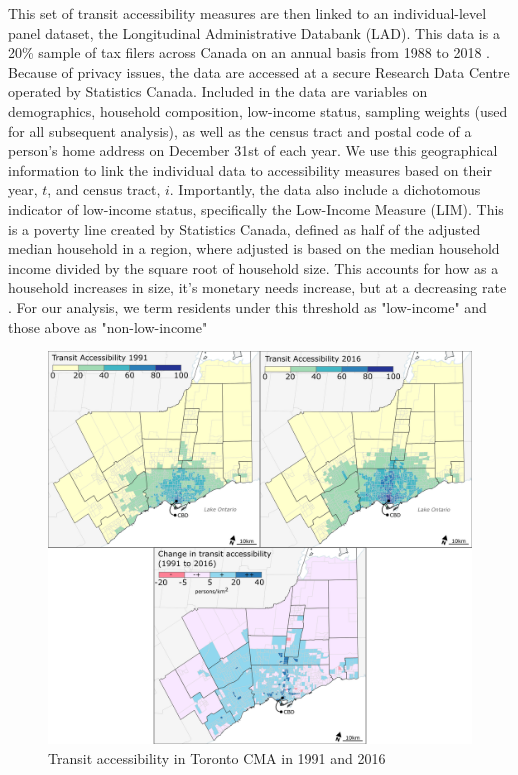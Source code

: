 This set of transit accessibility measures are then linked to an individual-level panel dataset, the Longitudinal Administrative Databank (LAD). This data is a 20\% sample of tax filers across Canada on an annual basis from 1988 to 2018 \cite{government_of_canada_longitudinal_2020}. Because of privacy issues, the data are accessed at a secure Research Data Centre operated by Statistics Canada. Included in the data are variables on demographics, household composition, low-income status, sampling weights (used for all subsequent analysis), as well as the census tract and postal code of a person's home address on December 31st of each year. We use this geographical information to link the individual data to accessibility measures based on their year, $t$, and census tract, $i$. Importantly, the data also include a dichotomous indicator of low-income status, specifically the Low-Income Measure (LIM). This is a poverty line created by Statistics Canada, defined as half of the adjusted median household in a region, where adjusted is based on the median household income divided by the square root of household size. This accounts for how as a household increases in size, it's monetary needs increase, but at a decreasing rate \cite{government_of_canada_longitudinal_2020}. For our analysis, we term residents under this threshold as "low-income" and those above as "non-low-income"

\begin{figure}[H]
	\centering
	\includegraphics[width=1\linewidth]{figures/acces_mapas.png}
	\caption{{Transit accessibility in Toronto CMA in 1991 and 2016}}
	\label{fig:accessmaps}
\end{figure}



